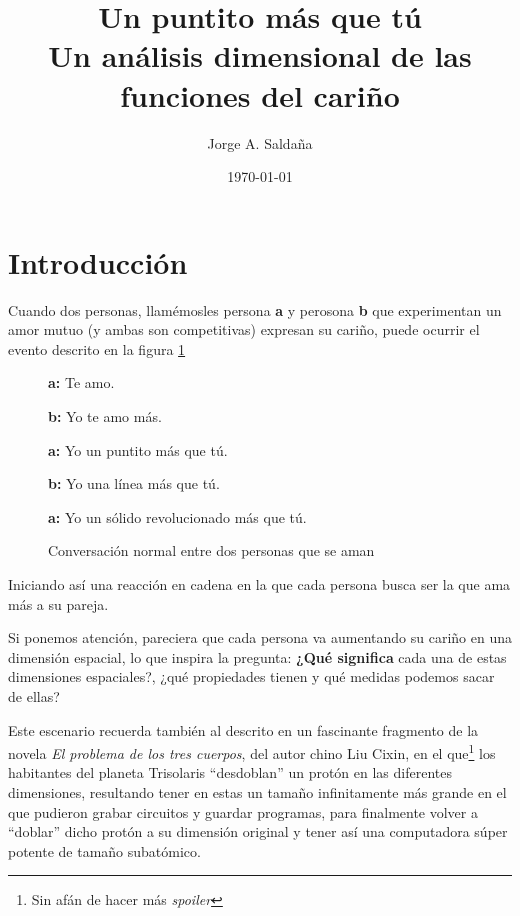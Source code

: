 \documentclass[12pt, oneside]{article}
\title{Un puntito más que tú \\ \vspace{0.5em}
\large Un análisis dimensional de las funciones del cariño}
\author{Jorge A. Saldaña}
\date{\today}							%
\newcommand{\speaker}[1]{\textbf{#1:}}
\begin{document}
\maketitle

\section{Introducción}
\label{sec:intro}
Cuando dos personas, llamémosles persona \textbf{a} y perosona \textbf{b} que experimentan un amor mutuo 
(y ambas son competitivas) expresan su cariño, puede ocurrir el evento descrito en la figura \ref{fig:conversacion1} 

\begin{figure}[h]
\centering %
\begin{minipage}{0.7\linewidth} %
\raggedright %
\label{fig:conversacion1}

\speaker{a} Te amo.

\speaker{b} Yo te amo más.

\speaker{a} Yo un puntito más que tú.

\speaker{b} Yo una línea más que tú.

\speaker{a} Yo un sólido revolucionado más que tú.

\end{minipage}
\caption{Conversación normal entre dos personas que se aman}
\end{figure}

Iniciando así una reacción en cadena en la que cada persona busca ser la que ama más a su pareja.

Si ponemos atención, pareciera que cada persona va aumentando su cariño en una dimensión espacial, lo que inspira la 
pregunta:
\textbf{¿Qué significa} cada una de estas dimensiones espaciales?, ¿qué propiedades tienen y qué medidas podemos 
sacar de ellas?

Este escenario recuerda también al descrito en un fascinante fragmento de la novela \textit{El problema de los tres 
cuerpos}, del autor chino Liu Cixin, en el que\footnote{Sin afán de hacer más \textit{spoiler}} los habitantes del 
planeta Trisolaris ``desdoblan'' un protón en las diferentes dimensiones, resultando tener en estas un tamaño 
infinitamente más grande en el que pudieron grabar circuitos y guardar programas, para finalmente volver a ``doblar'' dicho protón a su dimensión original y tener así una computadora súper potente de tamaño subatómico\cite{liu2016trescuerpos}.
\end{document}
